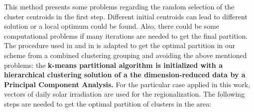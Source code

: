 This method presents some problems regarding the random selection of the cluster centroids in the first step. Different initial centroids can lead to different solution or a local optimum could be found. Also, there could be some computational problems if many iterations are needed to get the final partition.\\

The procedure used in \cite{Argueso2011} and in \cite{Zagouras2014} is adapted to get the optimal partition in our scheme from a combined clustering grouping and avoiding the above mentioned problems: the \textbf{k-means partitional algorithm is initialized with a hierarchical clustering solution of a the dimension-reduced data by a Principal Component Analysis.} For the particular case applied in this work, vectors of daily solar irradiation are used for the regionalization. The following steps are needed to get the optimal partition of clusters in the area:\\

